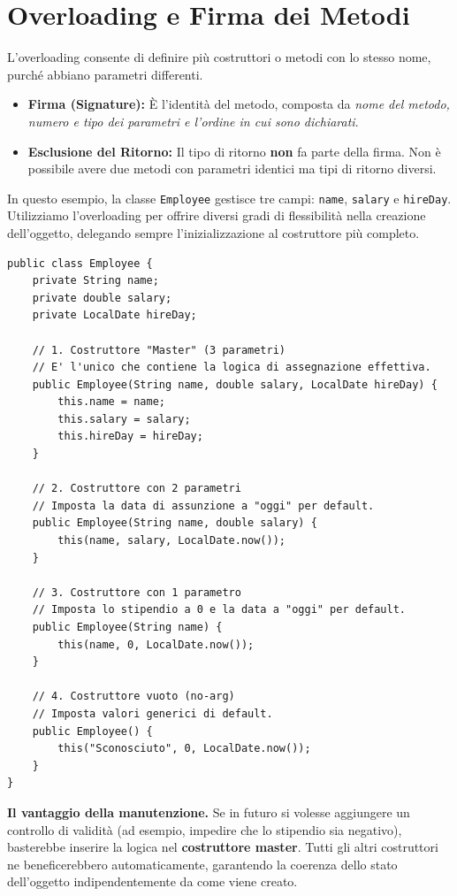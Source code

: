 \section{Overloading e Firma dei Metodi}
L'overloading consente di definire più costruttori o metodi con lo stesso nome, purché abbiano parametri differenti.
\begin{itemize}
    \item \textbf{Firma (Signature):} È l'identità del metodo, composta da \textit{nome del metodo, numero e tipo dei parametri e l'ordine in cui sono dichiarati}.
    \item \textbf{Esclusione del Ritorno:} Il tipo di ritorno \textbf{non} fa parte della firma. Non è possibile avere due metodi con parametri identici ma tipi di ritorno diversi.
\end{itemize}

In questo esempio, la classe \texttt{Employee} gestisce tre campi: \texttt{name}, \texttt{salary} e \texttt{hireDay}. Utilizziamo l'overloading per offrire diversi gradi di flessibilità nella creazione dell'oggetto, delegando sempre l'inizializzazione al costruttore più completo.

\begin{lstlisting}[caption={Overloading a cascata nella classe Employee}]
public class Employee {
    private String name;
    private double salary;
    private LocalDate hireDay;

    // 1. Costruttore "Master" (3 parametri)
    // E' l'unico che contiene la logica di assegnazione effettiva.
    public Employee(String name, double salary, LocalDate hireDay) {
        this.name = name;
        this.salary = salary;
        this.hireDay = hireDay;
    }

    // 2. Costruttore con 2 parametri
    // Imposta la data di assunzione a "oggi" per default.
    public Employee(String name, double salary) {
        this(name, salary, LocalDate.now());
    }

    // 3. Costruttore con 1 parametro
    // Imposta lo stipendio a 0 e la data a "oggi" per default.
    public Employee(String name) {
        this(name, 0, LocalDate.now());
    }

    // 4. Costruttore vuoto (no-arg)
    // Imposta valori generici di default.
    public Employee() {
        this("Sconosciuto", 0, LocalDate.now());
    }
}
\end{lstlisting}



\begin{observation}
    \textbf{Il vantaggio della manutenzione.} 
    Se in futuro si volesse aggiungere un controllo di validità (ad esempio, impedire che lo stipendio sia negativo), basterebbe inserire la logica nel \textbf{costruttore master}. Tutti gli altri costruttori ne beneficerebbero automaticamente, garantendo la coerenza dello stato dell'oggetto indipendentemente da come viene creato.
\end{observation}

